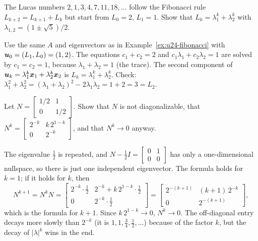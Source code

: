\begin{exercise}\label{exr:u24-lucas}
The Lucas numbers $2,1,3,4,7,11,18,\dots$ follow the Fibonacci rule
$L_{k+2}=L_{k+1}+L_k$ but start from $L_0=2$, $L_1=1$. Show that
$L_k=\lambda_1^{k}+\lambda_2^{k}$ with $\lambda_{1,2}=(1\pm\sqrt5)/2$.
\end{exercise}
\begin{solution}
Use the same $A$ and eigenvectors as in Example~\ref{ex:u24-fibonacci} with
$\boldsymbol{u}_0=(L_1,L_0)=(1,2)$. The equations $c_1+c_2=2$ and $c_1\lambda_1+c_2\lambda_2=1$ are
solved by $c_1=c_2=1$, because $\lambda_1+\lambda_2=1$ (the trace). The second component of
$\boldsymbol{u}_k=\lambda_1^{k}\boldsymbol{x}_1+\lambda_2^{k}\boldsymbol{x}_2$ is $L_k=\lambda_1^{k}+\lambda_2^{k}$.
Check: $\lambda_1^{2}+\lambda_2^{2}=(\lambda_1+\lambda_2)^{2}-2\lambda_1\lambda_2=1+2=3=L_2$.
\end{solution}

\begin{exercise}\label{exr:u24-jordan}
Let $N=\left[\begin{smallmatrix} 1/2 & 1\\ 0 & 1/2\end{smallmatrix}\right]$. Show that $N$
is not diagonalizable, that
$N^{k}=\left[\begin{smallmatrix} 2^{-k} & k\,2^{1-k}\\ 0 & 2^{-k}\end{smallmatrix}\right]$,
and that $N^{k}\to0$ anyway.
\end{exercise}
\begin{solution}
The eigenvalue $\tfrac12$ is repeated, and $N-\tfrac12I=\left[\begin{smallmatrix} 0&1\\ 0&0\end{smallmatrix}\right]$
has only a one-dimensional nullspace, so there is just one independent eigenvector. The
formula holds for $k=1$; if it holds for $k$, then
\[
  N^{k+1}=N^{k}N=\begin{bmatrix} 2^{-k}\cdot\tfrac12 & 2^{-k}+k\,2^{1-k}\cdot\tfrac12\\ 0 & 2^{-k}\cdot\tfrac12\end{bmatrix}
  =\begin{bmatrix} 2^{-(k+1)} & (k+1)\,2^{-k}\\ 0 & 2^{-(k+1)}\end{bmatrix},
\]
which is the formula for $k+1$. Since $k\,2^{1-k}\to0$, $N^{k}\to0$. The off-diagonal entry
decays more slowly than $2^{-k}$ (it is $1,1,\tfrac34,\tfrac12,\dots$) because of the factor
$k$, but the decay of $|\lambda|^{k}$ wins in the end.
\end{solution}
